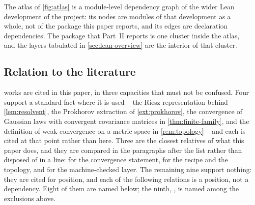 

The atlas of \cref{fig:atlas} is a module-level dependency graph of the wider
Lean development of the project: its nodes are modules of that development as a
whole, not of the package this paper reports, and its edges are declaration
dependencies.  The package that Part~II reports is one cluster inside the atlas,
and the layers tabulated in \cref{sec:lean-overview} are the interior of that
cluster.

\subsection{Relation to the literature}

\NumCitedWorks{} works are cited in this paper, in three capacities that must not
be confused.  Four support a standard fact where it is used -- the Riesz
representation behind \cref{lem:resolvent}, the Prokhorov extraction of
\cref{ext:prokhorov}, the convergence of Gaussian laws with convergent
covariance matrices in \cref{thm:finite-family}, and the definition of weak
convergence on a metric space in \cref{rem:topology} -- and each is cited at that
point rather than here.  Three are the closest relatives of what this paper
does, and they are compared in the paragraphs after the list rather than
disposed of in a line: \cite{cipriani2020} for the convergence statement,
\cite{biskup2020,peter2026} for the recipe and the topology, and
\cite{douglas2026} for the machine-checked layer.  The remaining nine support
nothing: they are cited for position, and each of the following relations is a
position, not a dependency.  Eight of them are named below; the ninth,
\cite{gjs1974}, is named among the exclusions above.

